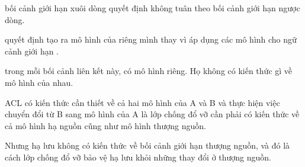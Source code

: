 bối cảnh giới hạn xuôi dòng quyết định không tuân theo bối cảnh giới hạn ngược dòng.

quyết định tạo ra mô hình của riêng mình thay vì áp dụng các mô hình cho ngữ cảnh giới hạn .





trong mỗi bối cảnh liên kết này, có mô hình riêng. Họ không có kiến thức gì về mô hình của nhau.

ACL có kiến thức cần thiết về cả hai mô hình của A và B và thực hiện việc chuyển đổi từ B sang mô hình của A là lớp chống đổ vỡ cần phải có kiến thức về cả mô hình hạ nguồn cũng như mô hình thượng nguồn.

Nhưng hạ lưu không có kiến thức về bối cảnh giới hạn thượng nguồn, và đó là cách lớp chống đổ vỡ bảo vệ hạ lưu khỏi những thay đổi ở thượng nguồn.









